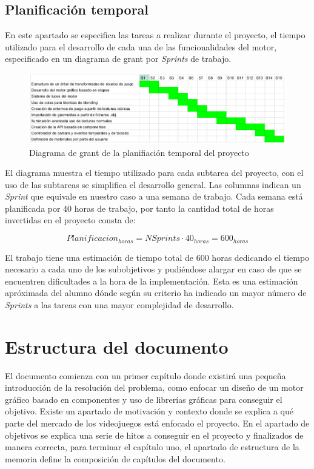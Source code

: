 \documentclass[a4paper]{book}
\begin{document}
\subsection{Planificación temporal}
\label{sec:planificacion-temporal}

En este apartado se especifica las tareas a realizar durante el proyecto, el tiempo utilizado para el desarrollo de cada una
de las funcionalidades del motor, especificado en un diagrama de grant por \textit{Sprints} de trabajo.

\begin{figure}[H]
    \centering
    \includegraphics[width=14cm, keepaspectratio]{img/Schedule.png}
    \caption{Diagrama de grant de la planifiación temporal del proyecto}
    \label{Schedule}
\end{figure}

El diagrama muestra el tiempo utilizado para cada subtarea del proyecto, con el uso de las subtareas se simplifica el
desarrollo general. Las columnas indican un \textit{Sprint} que equivale en nuestro caso a una semana de trabajo. Cada semana
está planificada por 40 horas de trabajo, por tanto la cantidad total de horas invertidas en el proyecto consta de:

\begin{equation} Planificacion_{horas} = NSprints \cdot 40_{horas} = 600_{horas} \end{equation}

El trabajo tiene una estimación de tiempo total de 600 horas dedicando el tiempo necesario a cada uno de los subobjetivos
y pudiéndose alargar en caso de que se encuentren dificultades a la hora de la implementación. Esta es una
estimación apróximada del alumno dónde según su criterio ha indicado un mayor número de \textit{Sprints}
a las tareas con una mayor complejidad de desarrollo.

\section{Estructura del documento}
\label{sec:estructura}

El documento comienza con un primer capítulo donde existirá una pequeña introducción de la resolución
del problema, como enfocar un diseño de un motor gráfico basado en componentes y uso de librerías gráficas
para conseguir el objetivo. Existe un apartado de motivación y contexto donde se explica a qué parte del
mercado de los videojuegos está enfocado el proyecto. En el apartado de objetivos se explica una serie de
hitos a conseguir en el proyecto y finalizados de manera correcta, para terminar el capítulo uno, el
apartado de estructura de la memoria define la composición de capítulos del documento.
\end{document}
